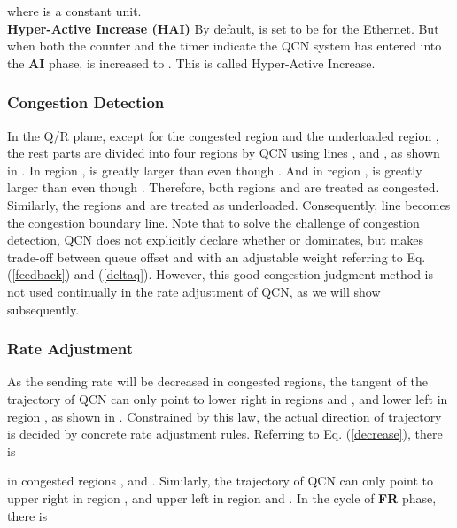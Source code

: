 \documentclass{sig-alternate-10pt}
\begin{document}
where  is a constant unit.
\\
\textbf{Hyper-Active Increase (HAI)}
By default,  is set to be  for the  Ethernet. But when both the counter and the timer indicate the QCN system has entered into the \textbf{AI} phase,  is increased to . This is called Hyper-Active Increase.
\iffalse
\\
\textbf{Target Rate Reduction}
If  is large than  by 10 times,  is decreased by a factor of 8. 
\\
\textbf{Extra Fast Recovery}
When RP receives consecutive feedback packets in one cycle, it just do RD once.
\fi



\subsubsection{Congestion Detection}
In the Q/R plane, except for the congested region  and the underloaded region , the rest parts are divided into four regions by QCN using lines ,  and , as shown in . In region ,  is greatly larger than  even though . And in region ,  is greatly larger than  even though . Therefore, both regions  and  are treated as congested. Similarly, the regions  and  are treated as underloaded. Consequently, line  becomes the congestion boundary line. Note that to solve the challenge of congestion detection, QCN does not explicitly declare whether  or  dominates, but makes trade-off between queue offset and  with an adjustable weight  referring to Eq. (\ref{feedback}) and (\ref{deltaq}). However, this good congestion judgment method is not used continually in the rate adjustment of QCN, as we will show subsequently.  



\subsubsection{Rate Adjustment}
As the sending rate will be decreased in congested regions, the tangent of the trajectory of QCN can only point to lower right in regions  and , and lower left in region , as shown in . Constrained by this law, the actual direction of trajectory is decided by concrete rate adjustment rules. Referring to Eq. (\ref{decrease}), there is

in congested regions , and . Similarly, the trajectory of QCN can only point to upper right in region , and upper left in region  and . In the  cycle of \textbf{FR} phase, there is
\end{document}
